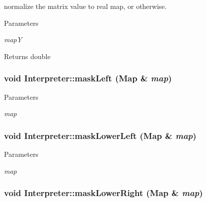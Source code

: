 normalize the matrix value to real map, or otherwise. 


\begin{DoxyParams}{Parameters}
\item[{\em mapY}]\end{DoxyParams}
\begin{DoxyReturn}{Returns}
double 
\end{DoxyReturn}
\hypertarget{classInterpreter_a454e31b3c1d0640be317c82c8b1b659d}{
\subsubsection[{maskLeft}]{\setlength{\rightskip}{0pt plus 5cm}void Interpreter::maskLeft ({\bf Map} \& {\em map})}}
\label{classInterpreter_a454e31b3c1d0640be317c82c8b1b659d}

\begin{DoxyParams}{Parameters}
\item[{\em map}]\end{DoxyParams}
\hypertarget{classInterpreter_af02271dded17efbe47316706aad115f7}{
\subsubsection[{maskLowerLeft}]{\setlength{\rightskip}{0pt plus 5cm}void Interpreter::maskLowerLeft ({\bf Map} \& {\em map})}}
\label{classInterpreter_af02271dded17efbe47316706aad115f7}

\begin{DoxyParams}{Parameters}
\item[{\em map}]\end{DoxyParams}
\hypertarget{classInterpreter_a5bafd4ac63cb3dee9a6ddff172a0df02}{
\subsubsection[{maskLowerRight}]{\setlength{\rightskip}{0pt plus 5cm}void Interpreter::maskLowerRight ({\bf Map} \& {\em map})}}
\label{classInterpreter_a5bafd4ac63cb3dee9a6ddff172a0df02}


